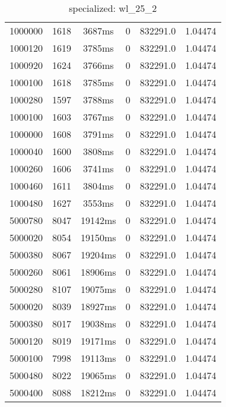 \documentclass[./main.tex]{subfiles}
\begin{document}
\begin{table}
\begin{tabular}{ c | c | c | c | c | c }
        \hline
        \rowcolor{lightgray} 1000000 & 1618 & 3687ms & 0 & 832291.0 & 1.04474 \\
        \rowcolor{lightgray} 1000120 & 1619 & 3785ms & 0 & 832291.0 & 1.04474 \\
        \rowcolor{lightgray} 1000920 & 1624 & 3766ms & 0 & 832291.0 & 1.04474 \\
        \rowcolor{lightgray} 1000100 & 1618 & 3785ms & 0 & 832291.0 & 1.04474 \\
        \rowcolor{lightgray} 1000280 & 1597 & 3788ms & 0 & 832291.0 & 1.04474 \\
        \rowcolor{lightgray} 1000100 & 1603 & 3767ms & 0 & 832291.0 & 1.04474 \\
        \rowcolor{lightgray} 1000000 & 1608 & 3791ms & 0 & 832291.0 & 1.04474 \\
        \rowcolor{lightgray} 1000040 & 1600 & 3808ms & 0 & 832291.0 & 1.04474 \\
        \rowcolor{lightgray} 1000260 & 1606 & 3741ms & 0 & 832291.0 & 1.04474 \\
        \rowcolor{lightgray} 1000460 & 1611 & 3804ms & 0 & 832291.0 & 1.04474 \\
        \rowcolor{lightgray} 1000480 & 1627 & 3553ms & 0 & 832291.0 & 1.04474 \\
        \hline
        \rowcolor{lightgray} 5000780 & 8047 & 19142ms & 0 & 832291.0 & 1.04474 \\
        \rowcolor{lightgray} 5000020 & 8054 & 19150ms & 0 & 832291.0 & 1.04474 \\
        \rowcolor{lightgray} 5000380 & 8067 & 19204ms & 0 & 832291.0 & 1.04474 \\
        \rowcolor{lightgray} 5000260 & 8061 & 18906ms & 0 & 832291.0 & 1.04474 \\
        \rowcolor{lightgray} 5000280 & 8107 & 19075ms & 0 & 832291.0 & 1.04474 \\
        \rowcolor{lightgray} 5000020 & 8039 & 18927ms & 0 & 832291.0 & 1.04474 \\
        \rowcolor{lightgray} 5000380 & 8017 & 19038ms & 0 & 832291.0 & 1.04474 \\
        \rowcolor{lightgray} 5000120 & 8019 & 19171ms & 0 & 832291.0 & 1.04474 \\
        \rowcolor{lightgray} 5000100 & 7998 & 19113ms & 0 & 832291.0 & 1.04474 \\
        \rowcolor{lightgray} 5000480 & 8022 & 19065ms & 0 & 832291.0 & 1.04474 \\
        \rowcolor{lightgray} 5000400 & 8088 & 18212ms & 0 & 832291.0 & 1.04474 \\
    \end{tabular}
    \caption{specialized: wl\_25\_2}
\end{table}
\end{document}
